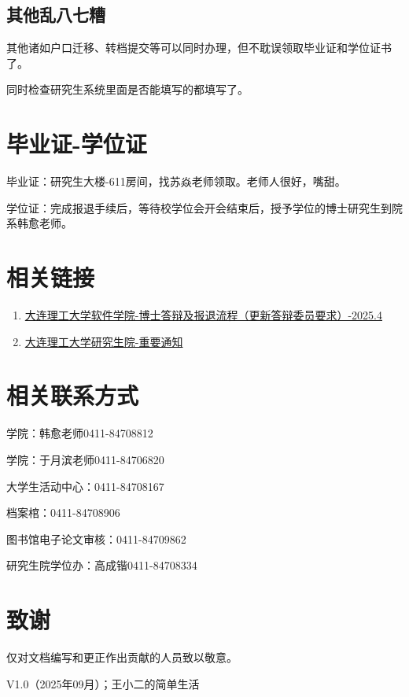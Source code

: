 \documentclass[12pt,a4paper]{ctexart}
\begin{document}
\subsection{其他乱八七糟}
\label{sec:luanbaqizao}

其他诸如户口迁移、转档提交等可以同时办理，但不耽误领取毕业证和学位证书了。

同时检查研究生系统里面是否能填写的都填写了。

  \section{毕业证-学位证}
\label{sec:certi}

毕业证：研究生大楼-611房间，找苏焱老师领取。老师人很好，嘴甜。

学位证：完成报退手续后，等待校学位会开会结束后，授予学位的博士研究生到院系韩愈老师。

\section{相关链接}
\label{sec:UsedLinks}
\begin{enumerate}
\item \href{https://ss.dlut.edu.cn/info/1341/24831.htm}{大连理工大学软件学院-博士答辩及报退流程（更新答辩委员要求）-2025.4}
  \item \href{https://gs.dlut.edu.cn/yjspy/pygcguan_li/zytz.htm}{大连理工大学研究生院-重要通知}
\end{enumerate}


\section{相关联系方式}
\label{sec:contact}

学院：韩愈老师0411-84708812

学院：于月滨老师0411-84706820

大学生活动中心：0411-84708167

档案棺：0411-84708906

图书馆电子论文审核：0411-84709862

研究生院学位办：高成锴0411-84708334

\section{致谢}
\label{sec:ack}

仅对文档编写和更正作出贡献的人员致以敬意。

V1.0（2025年09月）；王小二的简单生活
\end{document}
